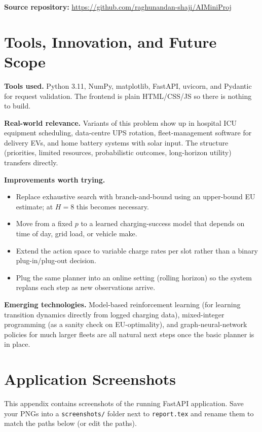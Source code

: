 \documentclass[11pt,a4paper]{article}
\begin{document}
\textbf{Source repository:}
\url{https://github.com/raghunandan-shaji/AIMiniProj}

\section{Tools, Innovation, and Future Scope}

\textbf{Tools used.} Python 3.11, NumPy, matplotlib, FastAPI, uvicorn, and
Pydantic for request validation. The frontend is plain HTML/CSS/JS so there is
nothing to build.

\textbf{Real-world relevance.} Variants of this problem show up in hospital
ICU equipment scheduling, data-centre UPS rotation, fleet-management software
for delivery EVs, and home battery systems with solar input. The structure
(priorities, limited resources, probabilistic outcomes, long-horizon utility)
transfers directly.

\textbf{Improvements worth trying.}
\begin{itemize}[leftmargin=1.3em, itemsep=2pt]
    \item Replace exhaustive search with branch-and-bound using an
          upper-bound EU estimate; at $H=8$ this becomes necessary.
    \item Move from a fixed $p$ to a learned charging-success model that
          depends on time of day, grid load, or vehicle make.
    \item Extend the action space to variable charge rates per slot rather
          than a binary plug-in/plug-out decision.
    \item Plug the same planner into an online setting (rolling horizon) so
          the system replans each step as new observations arrive.
\end{itemize}

\textbf{Emerging technologies.} Model-based reinforcement learning (for
learning transition dynamics directly from logged charging data),
mixed-integer programming (as a sanity check on EU-optimality), and
graph-neural-network policies for much larger fleets are all natural next
steps once the basic planner is in place.

\newpage
\appendix
\section{Application Screenshots}

This appendix contains screenshots of the running FastAPI application. Save
your PNGs into a \texttt{screenshots/} folder next to \texttt{report.tex} and
rename them to match the paths below (or edit the paths).
\end{document}
